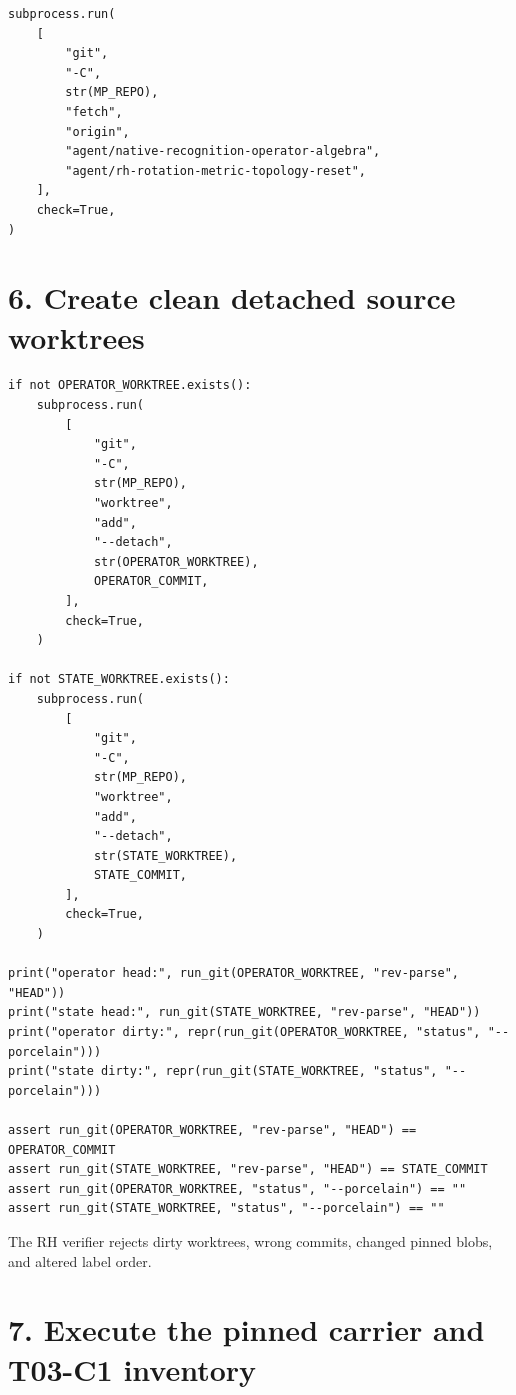 \begin{verbatim}
subprocess.run(
    [
        "git",
        "-C",
        str(MP_REPO),
        "fetch",
        "origin",
        "agent/native-recognition-operator-algebra",
        "agent/rh-rotation-metric-topology-reset",
    ],
    check=True,
)
\end{verbatim}

\hypertarget{create-clean-detached-source-worktrees}{%
\section{6. Create clean detached source worktrees}\label{create-clean-detached-source-worktrees}}

\begin{verbatim}
if not OPERATOR_WORKTREE.exists():
    subprocess.run(
        [
            "git",
            "-C",
            str(MP_REPO),
            "worktree",
            "add",
            "--detach",
            str(OPERATOR_WORKTREE),
            OPERATOR_COMMIT,
        ],
        check=True,
    )

if not STATE_WORKTREE.exists():
    subprocess.run(
        [
            "git",
            "-C",
            str(MP_REPO),
            "worktree",
            "add",
            "--detach",
            str(STATE_WORKTREE),
            STATE_COMMIT,
        ],
        check=True,
    )

print("operator head:", run_git(OPERATOR_WORKTREE, "rev-parse", "HEAD"))
print("state head:", run_git(STATE_WORKTREE, "rev-parse", "HEAD"))
print("operator dirty:", repr(run_git(OPERATOR_WORKTREE, "status", "--porcelain")))
print("state dirty:", repr(run_git(STATE_WORKTREE, "status", "--porcelain")))

assert run_git(OPERATOR_WORKTREE, "rev-parse", "HEAD") == OPERATOR_COMMIT
assert run_git(STATE_WORKTREE, "rev-parse", "HEAD") == STATE_COMMIT
assert run_git(OPERATOR_WORKTREE, "status", "--porcelain") == ""
assert run_git(STATE_WORKTREE, "status", "--porcelain") == ""
\end{verbatim}

The RH verifier rejects dirty worktrees, wrong commits, changed pinned blobs,
and altered label order.

\hypertarget{execute-the-pinned-carrier-and-t03-c1-inventory}{%
\section{7. Execute the pinned carrier and T03-C1 inventory}\label{execute-the-pinned-carrier-and-t03-c1-inventory}}

